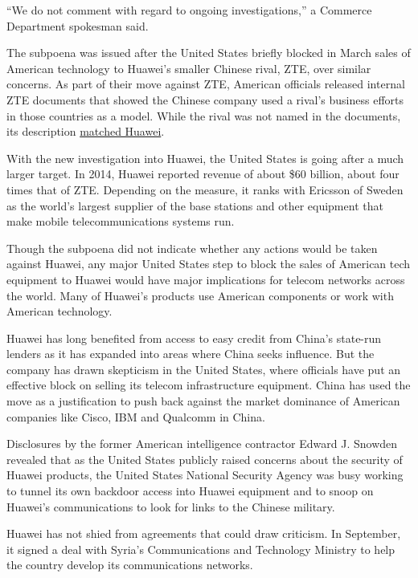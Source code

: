 ``We do not comment with regard to ongoing investigations,'' a Commerce
Department spokesman said.

The subpoena was issued after the United States briefly blocked in March
sales of American technology to Huawei's smaller Chinese rival, ZTE,
over similar concerns. As part of their move against ZTE, American
officials released internal ZTE documents that showed the Chinese
company used a rival's business efforts in those countries as a model.
While the rival was not named in the documents, its description
\href{http://www.nytimes.com/2016/03/19/technology/zte-document-raises-questions-about-huawei-and-sanctions.html}{matched
Huawei}.

With the new investigation into Huawei, the United States is going after
a much larger target. In 2014, Huawei reported revenue of about \$60
billion, about four times that of ZTE. Depending on the measure, it
ranks with Ericsson of Sweden as the world's largest supplier of the
base stations and other equipment that make mobile telecommunications
systems run.

Though the subpoena did not indicate whether any actions would be taken
against Huawei, any major United States step to block the sales of
American tech equipment to Huawei would have major implications for
telecom networks across the world. Many of Huawei's products use
American components or work with American technology.

Huawei has long benefited from access to easy credit from China's
state-run lenders as it has expanded into areas where China seeks
influence. But the company has drawn skepticism in the United States,
where officials have put an effective block on selling its telecom
infrastructure equipment. China has used the move as a justification to
push back against the market dominance of American companies like Cisco,
IBM and Qualcomm in China.

Disclosures by the former American intelligence contractor Edward J.
Snowden revealed that as the United States publicly raised concerns
about the security of Huawei products, the United States National
Security Agency was busy working to tunnel its own backdoor access into
Huawei equipment and to snoop on Huawei's communications to look for
links to the Chinese military.

Huawei has not shied from agreements that could draw criticism. In
September, it signed a deal with Syria's Communications and Technology
Ministry to help the country develop its communications networks.

